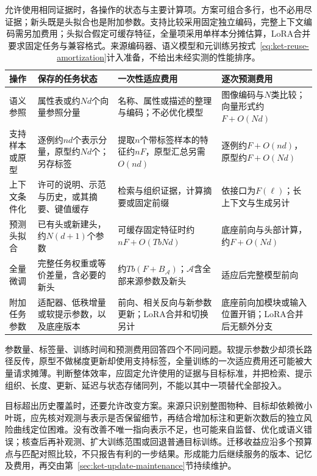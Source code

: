 \begin{table}[htbp]
  \centering
  \small
  \setlength{\tabcolsep}{4pt}
  \renewcommand{\arraystretch}{1.2}
  \begin{tabularx}{\linewidth}{@{}>{\raggedright\arraybackslash}p{24mm}
      >{\raggedright\arraybackslash}p{36mm}
      >{\raggedright\arraybackslash}X
      >{\raggedright\arraybackslash}X@{}}
    \toprule
    操作 & 保存的任务状态 & 一次性适应费用 & 逐次预测费用 \\
    \midrule
    语义参照 & 属性表或约$Nd$个向量参照分量 & 名称、属性或描述的整理与编码；不必优化模型 & 图像编码与$N$类比较；向量形式约$F+O(Nd)$ \\
    \addlinespace
    支持样本或原型 & 逐例约$nd$个表示分量，原型约$Nd$个；另存标签 & 提取$n$个带标签样本的特征约$nF$，原型汇总另需$O(nd)$ & 逐例约$F+O(nd)$，原型约$F+O(Nd)$ \\
    \addlinespace
    上下文条件化 & 许可的说明、示范与历史，或其摘要、键值缓存 & 检索与组织证据，计算摘要或固定前缀 & 依接口为$F(\ell)$；长上下文与生成另计 \\
    \addlinespace
    预测头拟合 & 已有头或新建头，约$N(d+1)$个参数 & 可缓存固定特征时约$nF+O(TbNd)$ & 底座前向与头部计算，约$F+O(Nd)$ \\
    \addlinespace
    全量微调 & 完整任务权重或等价差量，含必要的新头 & 约$Tb(F+B_{\mathcal A})$；$\mathcal A$含全部来源参数及新头 & 适应后完整模型前向 \\
    \addlinespace
    附加任务参数 & 适配器、低秩增量或软提示参数，以及底座版本 & 前向、相关反向与新参数更新；LoRA合并和切换另计 & 底座前向加模块或输入位置开销；LoRA合并后无额外分支 \\
    \bottomrule
  \end{tabularx}
  \caption{允许使用相同证据时，各操作的状态与主要计算项。方案可组合多行，也不必用尽证据；新头既是头拟合也是附加参数。支持比较采用固定独立编码，完整上下文编码需另加费用；头拟合假定可缓存特征，全量项采用单样本分摊估算，LoRA合并要求固定任务与兼容格式。来源编码器、语义模型和元训练另按式~\eqref{eq:ket-reuse-amortization}计入准备，不给出未经实测的性能排序。}
  \label{tab:ket-transfer-operation-cost}
\end{table}

参数量、标签量、训练时间和预测费用回答四个不同问题。软提示参数少却须长路径反传，原型不做梯度更新却使用支持标签，全量训练的一次适应费用还可能被大量请求摊薄。判断整体效率，应固定允许使用的证据与目标标准，并把检索、提示组织、长度、更新、延迟与状态存储同列，不能以其中一项替代全部投入。

目标超出历史覆盖时，还要允许改变方案。来源只识别整图物种、目标却依赖微小叶斑，应先核对观测与表示是否保留细节，再结合增加标注和更新次数后的独立风险曲线定位困难。没有改善不唯一指向表示不足，也可能来自监督、优化或语义错误；核查后再补观测、扩大训练范围或回退普通目标训练。迁移收益应沿多个预算点与匹配对照比较，不只报告有利的一步结果。形成能力后继续服务的版本、记忆及费用，再交由第~\ref{sec:ket-update-maintenance}节持续维护。

